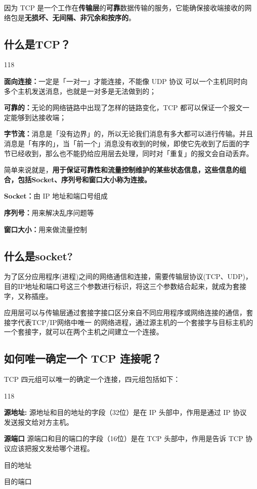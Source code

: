 \documentclass[cn,chinese,color=cyan]{elegantbook}
\begin{document}
因为 TCP 是一个工作在\textbf{传输层}的\textbf{可靠}数据传输的服务，它能确保接收端接收的网络包是\textbf{无损坏、无间隔、非冗余和按序的}。

\subsection{什么是TCP？}
\begin{dinglist}{118}
	\item \textbf{面向连接：}一定是「一对一」才能连接，不能像 UDP 协议 可以一个主机同时向多个主机发送消息，也就是一对多是无法做到的；
	
	\item \textbf{可靠的：}无论的网络链路中出现了怎样的链路变化，TCP 都可以保证一个报文一定能够到达接收端；
	
	\item \textbf{字节流：}消息是「没有边界」的，所以无论我们消息有多大都可以进行传输。并且消息是「有序的」，当「前一个」消息没有收到的时候，即使它先收到了后面的字节已经收到，那么也不能扔给应用层去处理，同时对「重复」的报文会自动丢弃。

\end{dinglist}

简单来说就是，\textbf{用于保证可靠性和流量控制维护的某些状态信息，这些信息的组合，包括Socket、序列号和窗口大小称为连接。}

\textbf{Socket：}由 IP 地址和端口号组成

\textbf{序列号：}用来解决乱序问题等

\textbf{窗口大小：}用来做流量控制

\subsection{什么是socket?}
为了区分应用程序(进程)之间的网络通信和连接，需要传输层协议(TCP、UDP)，目的IP地址和端口号这三个参数进行标识，将这三个参数结合起来，就成为套接字，又称插座。

应用层可以与传输层通过套接字接口区分来自不同应用程序或网络连接的通信，套接字代表TCP/IP网络中唯一 的网络进程，通过源主机的一个套接字与目标主机的一个套接字，就可以在两个主机之间建立一个连接。

\subsection{如何唯一确定一个 TCP 连接呢？}
TCP 四元组可以唯一的确定一个连接，四元组包括如下：
\begin{dinglist}{118}
	\item \textbf{源地址:} 源地址和目的地址的字段（32位）是在 IP 头部中，作用是通过 IP 协议发送报文给对方主机。
	\item \textbf{源端口 } 源端口和目的端口的字段（16位）是在 TCP 头部中，作用是告诉 TCP 协议应该把报文发给哪个进程。
	\item 目的地址
\item 	目的端口
\end{dinglist}
\end{document}
